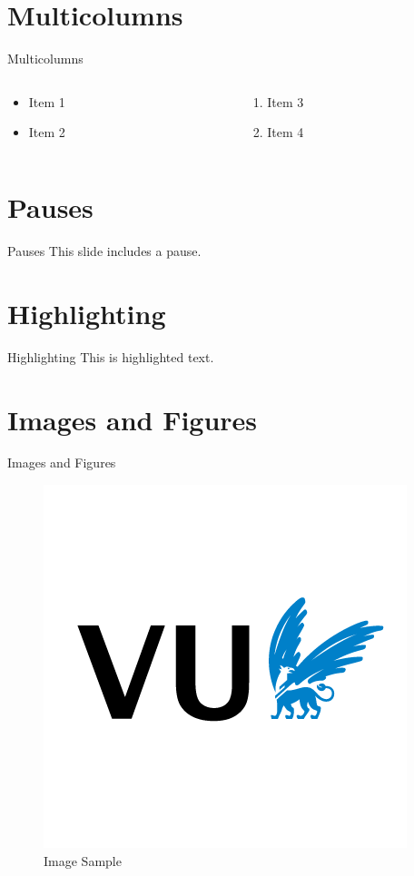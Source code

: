 \documentclass[aspectratio=43]{beamer}
\begin{document}
\section{Multicolumns}
\begin{frame}{Multicolumns}
  \begin{columns}[T] %
    \begin{column}{.5\textwidth}
      \begin{itemize}
        \item Item 1
        \item Item 2
      \end{itemize}
    \end{column}
    \begin{column}{.5\textwidth}
      \begin{enumerate}
        \item Item 3
        \item Item 4
      \end{enumerate}
    \end{column}
  \end{columns}
\end{frame}

\section{Pauses}
\begin{frame}{Pauses}
    This slide includes \pause a pause.
\end{frame}

\section{Highlighting}
\begin{frame}{Highlighting}
  This is \alert{highlighted} text.
\end{frame}

\section{Images and Figures}
\begin{frame}{Images and Figures}
  \begin{figure}
    \centering
    \includegraphics[width=.6\textwidth]{assets/VU-avatar-RGB.png}
    \caption{Image Sample}
  \end{figure}
\end{frame}
\end{document}
